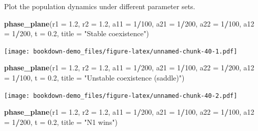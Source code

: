 \documentclass[
]{book}
\newenvironment{Shaded}{\begin{snugshade}}{\end{snugshade}}
\newcommand{\AttributeTok}[1]{\textcolor[rgb]{0.13,0.29,0.53}{#1}}
\newcommand{\DecValTok}[1]{\textcolor[rgb]{0.00,0.00,0.81}{#1}}
\newcommand{\FloatTok}[1]{\textcolor[rgb]{0.00,0.00,0.81}{#1}}
\newcommand{\FunctionTok}[1]{\textcolor[rgb]{0.13,0.29,0.53}{\textbf{#1}}}
\newcommand{\NormalTok}[1]{#1}
\newcommand{\SpecialCharTok}[1]{\textcolor[rgb]{0.81,0.36,0.00}{\textbf{#1}}}
\newcommand{\StringTok}[1]{\textcolor[rgb]{0.31,0.60,0.02}{#1}}
\begin{document}
Plot the population dynamics under different parameter sets.

\begin{Shaded}
\begin{Highlighting}[]
  \FunctionTok{phase\_plane}\NormalTok{(}\AttributeTok{r1 =} \FloatTok{1.2}\NormalTok{, }\AttributeTok{r2 =} \FloatTok{1.2}\NormalTok{, }\AttributeTok{a11 =} \DecValTok{1}\SpecialCharTok{/}\DecValTok{100}\NormalTok{, }
              \AttributeTok{a21 =} \DecValTok{1}\SpecialCharTok{/}\DecValTok{200}\NormalTok{, }\AttributeTok{a22 =} \DecValTok{1}\SpecialCharTok{/}\DecValTok{100}\NormalTok{, }\AttributeTok{a12 =} \DecValTok{1}\SpecialCharTok{/}\DecValTok{200}\NormalTok{, }
              \AttributeTok{t =} \FloatTok{0.2}\NormalTok{, }\AttributeTok{title =} \StringTok{"Stable coexistence"}\NormalTok{)}
\end{Highlighting}
\end{Shaded}

\texttt{[image: bookdown-demo\_files/figure-latex/unnamed-chunk-40-1.pdf]}

\begin{Shaded}
\begin{Highlighting}[]
  \FunctionTok{phase\_plane}\NormalTok{(}\AttributeTok{r1 =} \FloatTok{1.2}\NormalTok{, }\AttributeTok{r2 =} \FloatTok{1.2}\NormalTok{, }
              \AttributeTok{a11 =} \DecValTok{1}\SpecialCharTok{/}\DecValTok{200}\NormalTok{, }\AttributeTok{a21 =} \DecValTok{1}\SpecialCharTok{/}\DecValTok{100}\NormalTok{, }\AttributeTok{a22 =} \DecValTok{1}\SpecialCharTok{/}\DecValTok{200}\NormalTok{, }\AttributeTok{a12 =} \DecValTok{1}\SpecialCharTok{/}\DecValTok{100}\NormalTok{, }
              \AttributeTok{t =} \FloatTok{0.2}\NormalTok{, }\AttributeTok{title =} \StringTok{"Unstable coexistence (saddle)"}\NormalTok{)}
\end{Highlighting}
\end{Shaded}

\texttt{[image: bookdown-demo\_files/figure-latex/unnamed-chunk-40-2.pdf]}

\begin{Shaded}
\begin{Highlighting}[]
  \FunctionTok{phase\_plane}\NormalTok{(}\AttributeTok{r1 =} \FloatTok{1.2}\NormalTok{, }\AttributeTok{r2 =} \FloatTok{1.2}\NormalTok{, }
              \AttributeTok{a11 =} \DecValTok{1}\SpecialCharTok{/}\DecValTok{200}\NormalTok{, }\AttributeTok{a21 =} \DecValTok{1}\SpecialCharTok{/}\DecValTok{100}\NormalTok{, }\AttributeTok{a22 =} \DecValTok{1}\SpecialCharTok{/}\DecValTok{100}\NormalTok{, }\AttributeTok{a12 =} \DecValTok{1}\SpecialCharTok{/}\DecValTok{200}\NormalTok{, }
              \AttributeTok{t =} \FloatTok{0.2}\NormalTok{, }\AttributeTok{title =} \StringTok{"N1 wins"}\NormalTok{)}
\end{Highlighting}
\end{Shaded}
\end{document}
